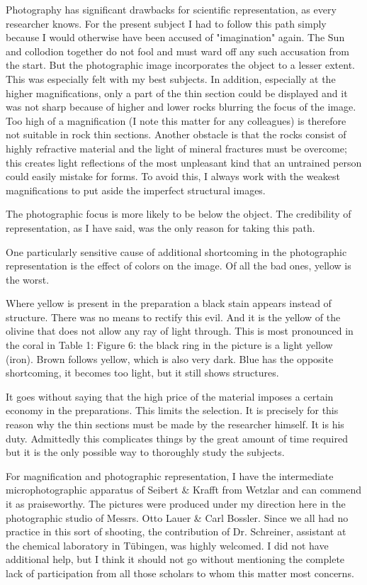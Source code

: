 \documentclass[a4paper, 11pt, oneside]{article}
\begin{document}
Photography has significant drawbacks for scientific representation, as every researcher knows. For the present subject I had to follow this path simply because I would otherwise have been accused of "imagination" again. The Sun and collodion together do not fool and must ward off any such accusation from the start. But the photographic image incorporates the object to a lesser extent. This was especially felt with my best subjects. In addition, especially at the higher magnifications, only a part of the thin section could be displayed and it was not sharp because of higher and lower rocks blurring the focus of the image. Too high of a magnification (I note this matter for any colleagues) is therefore not suitable in rock thin sections. Another obstacle is that the rocks consist of highly refractive material and the light of mineral fractures must be overcome; this creates light reflections of the most unpleasant kind that an untrained person could easily mistake for forms. To avoid this, I always work with the weakest magnifications to put aside the imperfect structural images.

The photographic focus is more likely to be below the object. The credibility of representation, as I have said, was the only reason for taking this path.

One particularly sensitive cause of additional shortcoming in the photographic representation is the effect of colors on the image. Of all the bad ones, yellow is the worst.

Where yellow is present in the preparation a black stain appears instead of structure. There was no means to rectify this evil. And it is the yellow of the olivine that does not allow any ray of light through. This is most pronounced in the coral in Table 1: Figure 6: the black ring in the picture is a light yellow (iron). Brown follows yellow, which is also very dark. Blue has the opposite shortcoming, it becomes too light, but it still shows structures.

It goes without saying that the high price of the material imposes a certain economy in the preparations. This limits the selection. It is precisely for this reason why the thin sections must be made by the researcher himself. It is his duty. Admittedly this complicates things by the great amount of time required but it is the only possible way to thoroughly study the subjects.

For magnification and photographic representation, I have the intermediate microphotographic apparatus of Seibert \& Krafft from Wetzlar and can commend it as praiseworthy. The pictures were produced under my direction here in the photographic studio of Messrs. Otto Lauer \& Carl Bossler. Since we all had no practice in this sort of shooting, the contribution of Dr. Schreiner, assistant at the chemical laboratory in Tübingen, was highly welcomed. I did not have additional help, but I think it should not go without mentioning the complete lack of participation from all those scholars to whom this matter most concerns.
\end{document}
